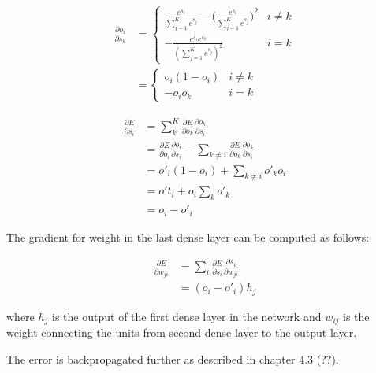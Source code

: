 \begin{equation}
\begin{split}
\frac{\partial o_i}{\partial s_k}  & = \left\{ \begin{array}{ll}
\frac{e^{s_{i}}}{\sum_{j=1}^{K} e^{s_{j}}} - \Big(\frac{e^{s_{i}}}{\sum_{j=1}^{K} e^{s_{j}}}\Big)^2 & \textrm{$i\neq k$}\\
-\frac{e^{s_{i}} e^{s_{k}}}{(\sum_{j=1}^{K}e^{s_{j}})^2} & \textrm{$i=k$}
\end{array} \right. \\
& = \left\{ \begin{array}{ll}
o_i (1-o_i)& \textrm{$i\neq k$}\\
-o_i o_k & \textrm{$i=k$}
\end{array} \right.
\end{split}
\end{equation}

\begin{equation} 
\begin{split}
\frac{\partial E}{\partial s_i} & = \sum_k^{K} \frac{\partial E}{\partial o_{k}} \frac{\partial o_{k}}{\partial s_{i}} \\
 & = \frac{\partial E}{\partial o_{i}} \frac{\partial o_{i}}{\partial s_{i}} - \sum_{k \neq i} \frac{\partial E}{\partial o_{k}}\frac{\partial o_{k}}{\partial s_{i}}\\
& = o'_{i} (1- o_{i}) + \sum_{k \neq i} o'_{k}o_{i}\\
& = o't_{i} + o_{i} \sum_{k} o'_{k} \\
& = o_{i} - o'_{i}
\end{split}
\end{equation}

The gradient for weight in the last dense layer can be computed as follows:

\begin{equation}
\begin{split}
\frac{\partial E}{\partial w_{ji}} & = \sum_{i}\frac{\partial E}{\partial s_{i}} \frac{\partial s_{i}}{\partial w_{ji}}\\
& = (o_{i} - o'_{i})h_{j}
\end{split}
\end{equation}

where $h_{j}$ is the output of the first dense layer in the network and $w_{ij}$ is the weight connecting the units from second dense layer to the output layer.

The error is backpropagated further as described in chapter 4.3 (??).

